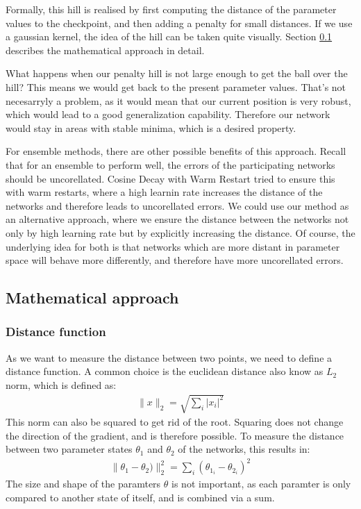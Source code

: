 Formally, this hill is realised by first computing the distance of the parameter
values to the checkpoint, and then adding a penalty for small distances. If we
use a gaussian kernel, the idea of the hill can be taken quite visually.
Section \ref{sub:Mathematical_approach} describes the mathematical approach in
detail.

What happens when our penalty hill is not large enough to get the ball over the
hill? This means we would get back to the present parameter values. That's not
necesarryly a problem, as it would mean that our current position is very
robust, which would lead to a good generalization capability. Therefore our
network would stay in areas with stable minima, which is a desired property.

For ensemble methods, there are other possible benefits of this approach. Recall
that for an ensemble to perform well, the errors of the participating networks
should be uncorellated. Cosine Decay with Warm Restart \cite{loshchilov2016sgdr}
tried to ensure this with warm restarts, where a high learnin rate increases the
distance of the networks and therefore leads to uncorellated errors. We could
use our method as an alternative approach, where we ensure the distance between
the networks not only by high learning rate but by explicitly increasing the
distance. Of course, the underlying idea for both is that networks which are
more distant in parameter space will behave more differently, and therefore have
more uncorellated errors.



\subsection{Mathematical approach}\label{sub:Mathematical_approach}
\subsubsection{Distance function}\label{distance_function}
As we want to measure the distance between two points, we need to define a
distance function. A common choice is the euclidean distance also know as $L_2$
norm, which is defined as: 
\begin{align}
    \rVert x \lVert_2 = \sqrt{\sum_i \lvert x_i \rvert^2}
\end{align}
This norm can also be squared to get rid of the root. Squaring does not change
the direction of the gradient, and is therefore possible. To measure the
distance between two parameter states $\theta_1$ and $\theta_2$ of the networks,
this results in:
\begin{align}\label{eq:distance}
    \rVert\theta_1 - \theta_2)\lVert_2^2= \sum_i (\theta_{1_i}-\theta_{2_i})^2
\end{align}
The size and shape of the paramters $\theta$ is not important, as each paramter
is only compared to another state of itself, and is combined via a sum.

